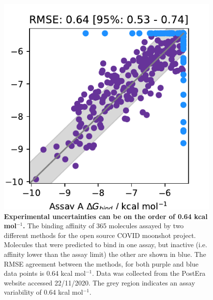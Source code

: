\documentclass[9pt,bestpractices]{livecoms}
\begin{document}
\begin{figure}
    \centering
    \includegraphics[width=0.95\linewidth]{figures/reporting/moonshot-assays.pdf}
    \caption{\textbf{Experimental uncertainties can be on the order of 0.64 kcal mol$^{-1}$.} The binding affinity of 365 molecules assayed by two different methods for the open source COVID moonshot project\cite{achdout2020covid}. Molecules that were predicted to bind in one assay, but inactive (i.e. affinity lower than the assay limit) the other are shown in blue. The RMSE agreement between the methods, for both purple and blue data points is 0.64 kcal mol$^{-1}$. Data was collected from the PostEra website\cite{posteracovid} accessed 22/11/2020. The grey region indicates an assay variability of 0.64 kcal mol$^{-1}$.}
    \label{fig:expt_agreement}
\end{figure}
\end{document}
